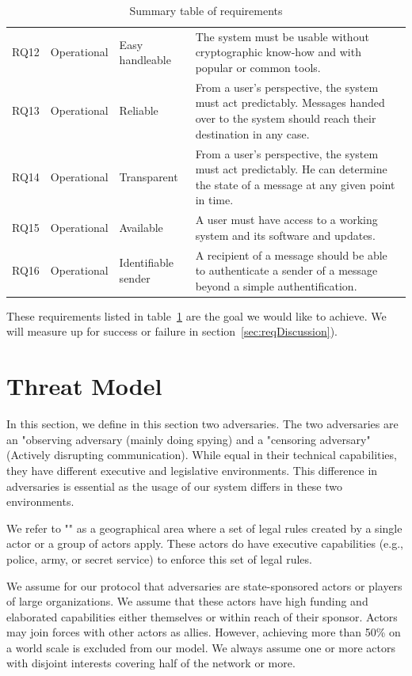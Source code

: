 \begin{table}[ht]
\begin{tabular}{|l|l|l|p{11.8cm}|}
		RQ12 & Operational & Easy handleable     & The system must be usable without cryptographic know-how and with popular or common tools. \\
		RQ13 & Operational & Reliable            & From a user's perspective, the system must act predictably. Messages handed over to the system should reach their destination in any case. \\
		RQ14 & Operational & Transparent         & From a user's perspective, the system must act predictably. He can determine the state of a message at any given point in time. \\
		RQ15 & Operational & Available           & A user must have access to a working system and its software and updates. \\
		RQ16 & Operational & Identifiable sender & A recipient of a message should be able to authenticate a sender of a message beyond a simple authentification.\\\hline
		
	\end{tabular}
	\egroup
	\caption{Summary table of requirements}
	\label{tab:requiremnts}
\end{table}

These requirements listed in table~\ref{tab:requiremnts} are the goal we would like to achieve. We will measure up for success or failure in section~\ref{sec:reqDiscussion}).

\section{Threat Model\label{sec:adversary}}
In this section, we define in this section two adversaries. The two adversaries are an "observing adversary (mainly doing spying) and a "censoring adversary" (Actively disrupting communication). While equal in their technical capabilities, they have different executive and legislative environments. This difference in adversaries is essential as the usage of our system differs in these two environments.

We refer to "" as a geographical area where a set of legal rules created by a single actor or a group of actors apply. These actors do have executive capabilities (e.g., police, army, or secret service) to enforce this set of legal rules.

We assume for our protocol that adversaries are state-sponsored actors or players of large organizations. We assume that these actors have high funding and elaborated capabilities either themselves or within reach of their sponsor. Actors may join forces with other actors as allies. However, achieving more than 50\% on a world scale is excluded from our model. We always assume one or more actors with disjoint interests covering half of the network or more. 

